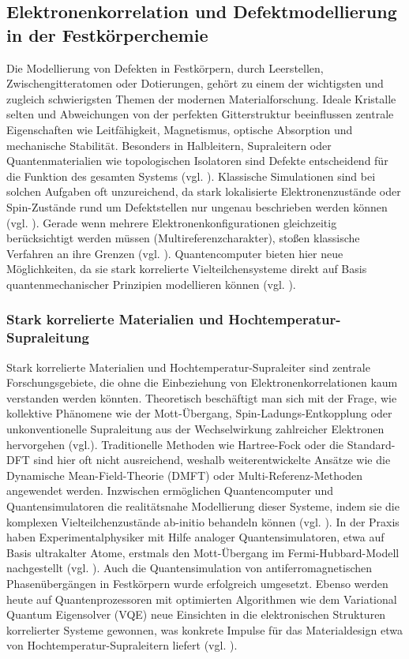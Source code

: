 \subsection{Elektronenkorrelation und Defektmodellierung in der Festkörperchemie}
Die Modellierung von Defekten in Festkörpern, durch Leerstellen, Zwischengitteratomen oder Dotierungen, gehört zu einem der wichtigsten und zugleich schwierigsten Themen der modernen Materialforschung. Ideale Kristalle selten und Abweichungen von der perfekten Gitterstruktur beeinflussen zentrale Eigenschaften wie Leitfähigkeit, Magnetismus, optische Absorption und mechanische Stabilität. Besonders in Halbleitern, Supraleitern oder Quantenmaterialien wie topologischen Isolatoren sind Defekte entscheidend für die Funktion des gesamten Systems (vgl. \cite{bassett_quantum_2019}).
Klassische Simulationen sind bei solchen Aufgaben oft unzureichend, da stark lokalisierte Elektronenzustände oder Spin-Zustände rund um Defektstellen nur ungenau beschrieben werden können (vgl. \cite{bauer_quantum_2020}). Gerade wenn mehrere Elektronenkonfigurationen gleichzeitig berücksichtigt werden müssen (Multireferenzcharakter), stoßen klassische Verfahren an ihre Grenzen (vgl. \cite{bassett_quantum_2019}).
Quantencomputer bieten hier neue Möglichkeiten, da sie stark korrelierte Vielteilchensysteme direkt auf Basis quantenmechanischer Prinzipien modellieren können (vgl. \cite{daley_practical_2022}).

\subsubsection{Stark korrelierte Materialien und Hochtemperatur-Supraleitung}

Stark korrelierte Materialien und Hochtemperatur-Supraleiter sind zentrale Forschungsgebiete, die ohne die Einbeziehung von Elektronenkorrelationen kaum verstanden werden könnten. Theoretisch beschäftigt man sich mit der Frage, wie kollektive Phänomene wie der Mott-Übergang, Spin-Ladungs-Entkopplung oder unkonventionelle Supraleitung aus der Wechselwirkung zahlreicher Elektronen hervorgehen (vgl.\cite{daley_practical_2022}). Traditionelle Methoden wie Hartree-Fock oder die Standard-DFT sind hier oft nicht ausreichend, weshalb weiterentwickelte Ansätze wie die Dynamische Mean-Field-Theorie (DMFT) oder Multi-Referenz-Methoden angewendet werden. Inzwischen ermöglichen Quantencomputer und Quantensimulatoren die realitätsnahe Modellierung dieser Systeme, indem sie die komplexen Vielteilchenzustände ab-initio behandeln können (vgl. \cite{baker_simulating_2024}).
In der Praxis haben Experimentalphysiker mit Hilfe analoger Quantensimulatoren, etwa auf Basis ultrakalter Atome, erstmals den Mott-Übergang im Fermi-Hubbard-Modell nachgestellt (vgl. \cite{daley_practical_2022}). Auch die Quantensimulation von antiferromagnetischen Phasenübergängen in Festkörpern wurde erfolgreich umgesetzt. Ebenso werden heute auf Quantenprozessoren mit optimierten Algorithmen wie dem Variational Quantum Eigensolver (VQE) neue Einsichten in die elektronischen Strukturen korrelierter Systeme gewonnen, was konkrete Impulse für das Materialdesign etwa von Hochtemperatur-Supraleitern liefert (vgl. \cite{weidman_quantum_2024}).

